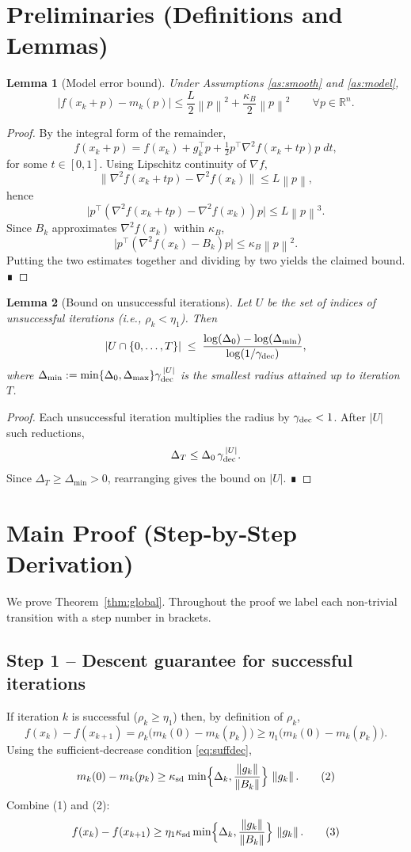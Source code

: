 \documentclass[11pt]{article}
\newtheorem{lemma}{Lemma}
\newcommand{\R}{\mathbb{R}}
\newcommand{\norm}[1]{\left\lVert#1\right\rVert}
\begin{document}
\section*{Preliminaries (Definitions and Lemmas)}
\begin{lemma}[Model error bound]\label{lem:model_error}
Under Assumptions \ref{as:smooth} and \ref{as:model},
\[
\bigl|f(x_{k}+p)-m_{k}(p)\bigr|
\le \frac{L}{2}\norm{p}^{2}
     +\frac{\kappa_{B}}{2}\norm{p}^{2}
\qquad\forall p\in\R^{n}.
\]
\end{lemma}
\begin{proof}
By the integral form of the remainder,
\[
f(x_{k}+p)=f(x_{k})+g_{k}^{\top}p+\tfrac12 p^{\top}\nabla^{2}f(x_{k}+t p)p\;dt,
\]
for some $t\in[0,1]$. Using Lipschitz continuity of $\nabla f$,
\[
\bigl\|\nabla^{2}f(x_{k}+tp)-\nabla^{2}f(x_{k})\bigr\|\le L\norm{p},
\]
hence
\[
\bigl|p^{\top}(\nabla^{2}f(x_{k}+tp)-\nabla^{2}f(x_{k}))p\bigr|
\le L\norm{p}^{3}.
\]
Since $B_{k}$ approximates $\nabla^{2}f(x_{k})$ within $\kappa_{B}$,
\[
\bigl|p^{\top}(\nabla^{2}f(x_{k})-B_{k})p\bigr|
\le \kappa_{B}\norm{p}^{2}.
\]
Putting the two estimates together and dividing by two yields the claimed bound. ∎
\end{proof}

\begin{lemma}[Bound on unsuccessful iterations]\label{lem:unsucc}
Let $U$ be the set of indices of unsuccessful iterations (i.e., $\rho_{k}<\eta_{1}$). Then
\[
|U\cap\{0,\dots,T\}|\;\le\;
\frac{\log(\Delta_{0})-\log(\Delta_{\min})}{\log(1/\gamma_{\rm dec})},
\]
where $\Delta_{\min}:=\min\{\Delta_{0},\Delta_{\max}\}\gamma_{\rm dec}^{\,|U|}$ is the smallest radius attained up to iteration $T$.
\end{lemma}
\begin{proof}
Each unsuccessful iteration multiplies the radius by $\gamma_{\rm dec}<1$. After $|U|$ such reductions,
\[
\Delta_{T}\le\Delta_{0}\,\gamma_{\rm dec}^{\,|U|}.
\]
Since $\Delta_{T}\ge \Delta_{\min}>0$, rearranging gives the bound on $|U|$. ∎
\end{proof}

\section*{Main Proof (Step‑by‑Step Derivation)}
We prove Theorem~\ref{thm:global}. Throughout the proof we label each non‑trivial transition with a step number in brackets.

\subsection*{Step 1 – Descent guarantee for successful iterations}
If iteration $k$ is successful ($\rho_{k}\ge\eta_{1}$) then, by definition of $\rho_{k}$,
\[
f(x_{k})-f(x_{k+1})=\rho_{k}\bigl(m_{k}(0)-m_{k}(p_{k})\bigr)
\ge\eta_{1}\bigl(m_{k}(0)-m_{k}(p_{k})\bigr). \tag{1}
\]
Using the sufficient‑decrease condition \eqref{eq:suffdec},
\[
m_{k}(0)-m_{k}(p_{k})\ge\kappa_{\rm sd}\,
\min\!\Big\{\Delta_{k},\frac{\norm{g_{k}}}{\norm{B_{k}}}\Big\}\,\norm{g_{k}}. \tag{2}
\]
Combine (1) and (2):
\[
f(x_{k})-f(x_{k+1})\ge\eta_{1}\kappa_{\rm sd}
\min\!\Big\{\Delta_{k},\frac{\norm{g_{k}}}{\norm{B_{k}}}\Big\}\,\norm{g_{k}}. \tag{3}
\]
\end{document}
